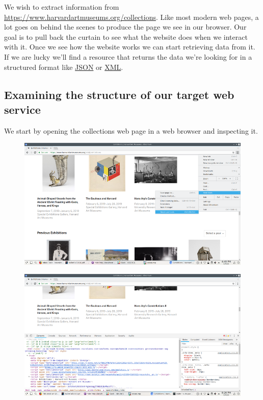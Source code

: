 \documentclass[]{book}
\begin{document}
We wish to extract information from
\url{https://www.harvardartmuseums.org/collections}. Like most modern
web pages, a lot goes on behind the scenes to produce the page we see in
our browser. Our goal is to pull back the curtain to see what the
website does when we interact with it. Once we see how the website works
we can start retrieving data from it. If we are lucky we'll find a
resource that returns the data we're looking for in a structured format
like \href{https://json.org/}{JSON} or
\href{https://en.wikipedia.org/wiki/XML}{XML}.

\subsection{Examining the structure of our target web
service}\label{examining-the-structure-of-our-target-web-service}

We start by opening the collections web page in a web browser and
inspecting it.

\begin{figure}
\centering
\includegraphics{Python/PythonWebScrape/images/dev_tools.png}
\caption{}
\end{figure}

\begin{figure}
\centering
\includegraphics{Python/PythonWebScrape/images/dev_tools_pane.png}
\caption{}
\end{figure}
\end{document}

